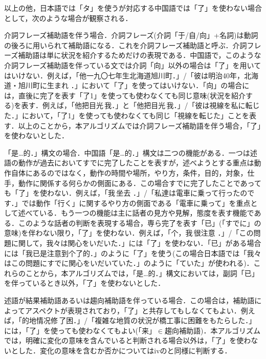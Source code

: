 以上の他，日本語では「タ」を使うが対応する中国語では「了」を使わない場合として，次のような場合が観察される\cite{Ryu1996}．
\begin{enumerater}
\renewcommand{\labelenumi}{}
\renewcommand{\theenumi}{}
\item 介詞フレーズ補助語を伴う場合．介詞フレーズ(介詞「于/自/向」+名詞)は動詞の後ろに用いられて補助語になる．これを介詞フレーズ補助語と呼ぶ．介詞フレーズ補助語は単に状況を紹介するためだけの表現である．中国語で，このような介詞フレーズ補助語を伴っている文では介詞「向」以外の場合は「了」を用いてはいけない．例えば，「他一九〇七年生北海道旭川町．」/「彼は明治40年，北海道・旭川町に生まれ ．」において「了」を使ってはいけない．「向」の場合には，直後に完了を表す「了1」を使っても使わなくても同じ意味(状況を紹介する)を表す．例えば，「他把目光\,我．」と「他把目光\,我．」/「彼は視線を私に転じた．」において，「了1」を使っても使わなくても同じ「視線を転じた」ことを表す．以上のことから，本アルゴリズムでは介詞フレーズ補助語を伴う場合，「了」を使わないとした．
\item 「是…的．」構文の場合．中国語「是…的．」構文は二つの機能がある．一つは述語の動作が過去においてすでに完了したことを表すが，述べようとする重点は動作自体にあるのではなく，動作の時間や場所，やり方，条件，目的，対象，仕手，動作に関係する何らかの側面にある．この場合すでに完了したことであっても「了」を使わない．例えば，「我\,坐去 ．」/「私達は電車に乗って行ったのです．」では動作「行く」に関するやり方の側面である「電車に乗って」を重点として述べている．もう一つの機能は主に話者の見方や見解，態度を表す機能である．このような話者の判断を表現する場合，専ら完了を表す「已」(「すでに」の意味)を伴わない限り，「了」を使わない．例えば，「个，我\,很注意 ．」/「この問題に関して，我々は関心をいだいた．」には「了」を使わない．「已」がある場合には「我已是注意到个了的．」のように「了」を使う(この場合日本語では「我々はこの問題にすでに関心をいだいていた．」のように「ていた」が使われる)．これらのことから，本アルゴリズムでは，「是…的．」構文においては，副詞「已」を伴っているとき以外，「了」を使わないとした．
\item 述語が結果補助語あるいは趨向補助語を伴っている場合．この場合は，補助語によってアスペクトが表現されており，「了」と共存してもしなくてもよい．例えば，「的地情况修\,了困．」/「複雑な地質の状況が橋工事に困難をもたらした．」には，「了」を使っても使わなくてもよい(「来」$\in$趨向補助語)．本アルゴリズムでは，明確に変化の意味を含んでいると判断される場合以外は，「了」を使わないとした．変化の意味を含むか否かについてはivのと同様に判断する．
\end{enumerater}


